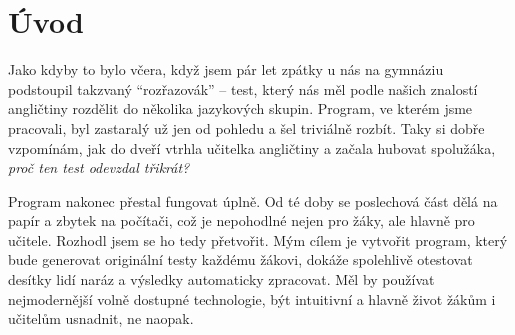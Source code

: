 \chapter*{Úvod}

Jako kdyby to bylo včera, když jsem pár let zpátky u nás na gymnáziu podstoupil takzvaný \enquote{rozřazovák} -- test, který nás měl podle našich znalostí angličtiny rozdělit do několika jazykových skupin. Program, ve kterém jsme pracovali, byl zastaralý už jen od pohledu a šel triviálně rozbít. Taky si dobře vzpomínám, jak do dveří vtrhla učitelka angličtiny a začala hubovat spolužáka, \textit{proč ten test odevzdal třikrát?}

Program nakonec přestal fungovat úplně. Od té doby se poslechová část dělá na papír a zbytek na počítači, což je nepohodlné nejen pro žáky, ale hlavně pro učitele. Rozhodl jsem se ho tedy přetvořit. Mým cílem je vytvořit program, který bude generovat originální testy každému žákovi, dokáže spolehlivě otestovat desítky lidí naráz a výsledky automaticky zpracovat. Měl by používat nejmodernější volně dostupné technologie, být intuitivní a hlavně život žákům i učitelům usnadnit, ne naopak.